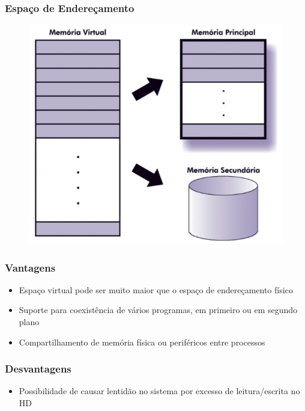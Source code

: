 \documentclass[aspectratio=169,
				xcolor=table]{beamer}
\begin{document}
	\begin{frame}
		\frametitle{Espaço de Endereçamento}
		\begin{figure}[hbtp]
		\centering
		\includegraphics[height=0.75\textheight, keepaspectratio]{../figs/cap09/enderecamento2.png}
		\end{figure}
		
	\end{frame}
	
	\begin{frame}
		\frametitle{Vantagens}
		\begin{itemize}
			\item Espaço virtual pode ser muito maior que o espaço de endereçamento físico
			\vspace{1em}
			\item Suporte para coexistência de vários programas, em primeiro ou em segundo plano
			\vspace{1em}
			\item Compartilhamento de memória física ou periféricos entre processos
		\end{itemize}
	\end{frame}
	
	\begin{frame}
		\frametitle{Desvantagens}
		\begin{itemize}
			\item Possibilidade de causar lentidão no sistema por excesso de leitura/escrita no HD
		\end{itemize}
	\end{frame}
	
\end{document}
